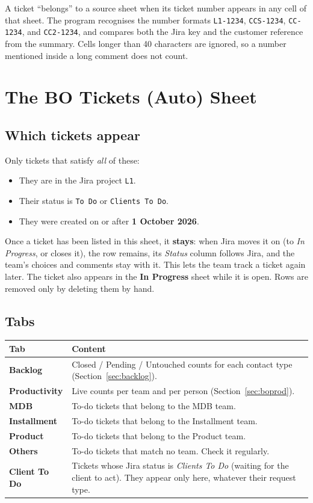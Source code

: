 \documentclass[11pt,a4paper]{article}
\newcommand{\code}[1]{\texttt{#1}}
\newcommand{\tab}[1]{\textbf{#1}}
\let\oldsection\section
\renewcommand{\section}{\needspace{12\baselineskip}\oldsection}
\let\oldsubsection\subsection
\renewcommand{\subsection}{\needspace{7\baselineskip}\oldsubsection}
\begin{document}
A ticket ``belongs'' to a source sheet when its ticket number appears in any cell of that sheet. The program recognises
the number formats \code{L1-1234}, \code{CCS-1234}, \code{CC-1234}, and \code{CC2-1234}, and compares both the Jira key
and the customer reference from the summary. Cells longer than 40 characters are ignored, so a number mentioned inside a
long comment does not count.

\section{The BO Tickets (Auto) Sheet}

\subsection{Which tickets appear}
Only tickets that satisfy \emph{all} of these:
\begin{itemize}
  \item They are in the Jira project \code{L1}.
  \item Their status is \code{To Do} or \code{Clients To Do}.
  \item They were created on or after \textbf{1 October 2026}.
\end{itemize}
Once a ticket has been listed in this sheet, it \textbf{stays}: when Jira moves it on (to \emph{In Progress}, or closes
it), the row remains, its \emph{Status} column follows Jira, and the team's choices and comments stay with it. This
lets the team track a ticket again later. The ticket also appears in the \tab{In Progress} sheet while it is open. Rows
are removed only by deleting them by hand.

\subsection{Tabs}
\begin{tabularx}{\linewidth}{@{}l L@{}}
\toprule
\textbf{Tab} & \textbf{Content} \\
\midrule
\tab{Backlog} & Closed / Pending / Untouched counts for each contact type (Section~\ref{sec:backlog}). \\
\tab{Productivity} & Live counts per team and per person (Section~\ref{sec:boprod}). \\
\tab{MDB} & To-do tickets that belong to the MDB team. \\
\tab{Installment} & To-do tickets that belong to the Installment team. \\
\tab{Product} & To-do tickets that belong to the Product team. \\
\tab{Others} & To-do tickets that match no team. Check it regularly. \\
\tab{Client To Do} & Tickets whose Jira status is \emph{Clients To Do} (waiting for the client to act). They appear
only here, whatever their request type. \\
\bottomrule
\end{tabularx}
\end{document}
